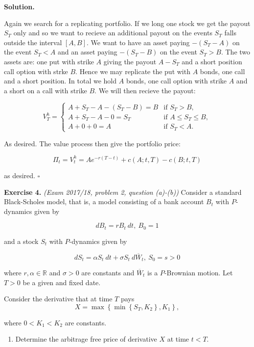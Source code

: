 \documentclass[
]{article}
\providecommand{\tightlist}{%
  \setlength{\itemsep}{0pt}\setlength{\parskip}{0pt}}
\begin{document}
\textbf{Solution.}

Again we search for a replicating portfolio. If we long one stock we get
the payout \(S_T\) only and so we want to recieve an additional payout
on the events \(S_T\) falls outside the interval \([A,B]\). We want to
have an asset paying \(-(S_T-A)\) on the event \(S_T<A\) and an asset
paying \(-(S_T-B)\) on the event \(S_T>B\). The two assets are: one put
with strike \(A\) giving the payout \(A-S_T\) and a short position call
option with strke \(B\). Hence we may replicate the put with \(A\)
bonds, one call and a short position. In total we hold \(A\) bonds, one
call option with strike \(A\) and a short on a call with strike \(B\).
We will then recieve the payout:

\[
V_T^h=
\begin{cases}
  A+S_T-A-(S_T-B)=B & \text{if }S_T>B,\\
  A + S_T - A-0=S_T& \text{if }A\le S_T\le B,\\
  A+0+0=A &\text{if }S_T< A.
\end{cases}
\]

As desired. The value process then give the portfolio price:

\[
\Pi_t=V_t^h=Ae^{-r(T-t)}+c(A;t,T)-c(B;t,T)
\]

as desired. \(\square\)

\textbf{Exercise 4.} \emph{(Exam 2017/18, problem 2, question (a)-(b))}
Consider a standard Black-Scholes model, that is, a model consisting of
a bank account \(B_t\) with \(P\)-dynamics given by

\[
dB_t=rB_t\ dt,\ B_0=1
\]

and a stock \(S_t\) with \(P\)-dynamics given by

\[
dS_t=\alpha S_t\ dt+\sigma S_t\ d\overline{W}_t,\ S_0=s>0
\]

where \(r,\alpha\in\mathbb{R}\) and \(\sigma >0\) are constants and
\(\overline{W}_t\) is a \(P\)-Brownian motion. Let \(T>0\) be a given
and fixed date.

Consider the derivative that at time \(T\) pays \[
X=\max\left\{\min\left\{S_T,K_2\right\},K_1\right\},
\]

where \(0<K_1<K_2\) are constants.

\begin{enumerate}
\def\labelenumi{\alph{enumi}.}
\tightlist
\item
  Determine the arbitrage free price of derivative \(X\) at time
  \(t<T\).
\end{enumerate}
\end{document}
